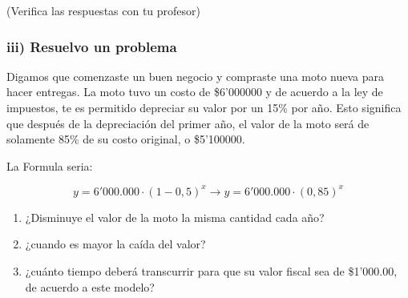 \documentclass[12pt,a4paper]{article}
\begin{document}
(Verifica las respuestas con tu profesor)

\subsubsection*{iii) Resuelvo un problema}

Digamos que comenzaste un buen negocio y compraste una moto nueva para hacer entregas. La moto tuvo un costo de \$6'000000 y de acuerdo a la ley de impuestos, te es permitido depreciar su valor por un 15\% por año. Esto significa que después de la depreciación del primer año, el valor de la moto será de solamente 85\% de su costo original, o \$5'100000.

La Formula seria:

$$y = 6'000.000 \cdot (1 - 0,5)^x \longrightarrow y = 6'000.000 \cdot (0,85)^x$$

\begin{enumerate}[label=\alph*.]
\item ¿Disminuye el valor de la moto la misma cantidad cada año?
\item ¿cuando es mayor la caída del valor?
\item ¿cuánto tiempo deberá transcurrir para que su valor fiscal sea de \$1'000.00, de acuerdo a este modelo?
\end{enumerate}

\end{document}
